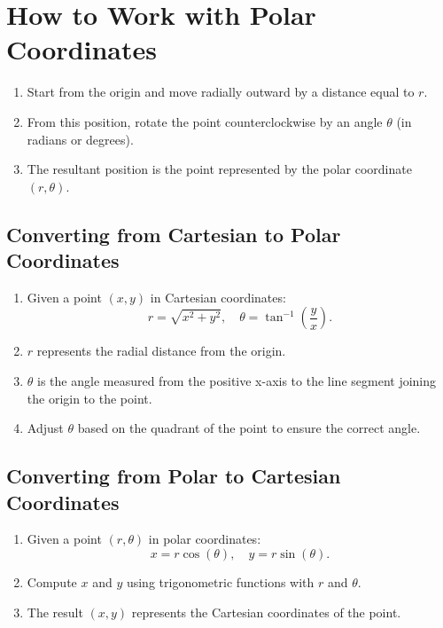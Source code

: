 \documentclass{article}
\begin{document}
\section*{How to Work with Polar Coordinates}
\begin{tipbox}
    \begin{enumerate}
        \item Start from the origin and move radially outward by a distance equal to \( r \).
        \item From this position, rotate the point counterclockwise by an angle \( \theta \) (in radians or degrees).
        \item The resultant position is the point represented by the polar coordinate \( (r, \theta) \).
    \end{enumerate}
    
    \vspace{1em}
    
    \subsection*{Converting from Cartesian to Polar Coordinates}
    \begin{algorithmbox}
    
        \begin{enumerate}
            \item Given a point \( (x, y) \) in Cartesian coordinates:
                  \[
                  r = \sqrt{x^2 + y^2}, \quad \theta = \tan^{-1}\left(\frac{y}{x}\right).
                  \]
            \item \( r \) represents the radial distance from the origin.
            \item \( \theta \) is the angle measured from the positive x-axis to the line segment joining the origin to the point.
            \item Adjust \( \theta \) based on the quadrant of the point to ensure the correct angle.
        \end{enumerate}
    \end{algorithmbox}
    
    \vspace{1em}
    
    \subsection*{Converting from Polar to Cartesian Coordinates}
    \begin{algorithmbox}
        \begin{enumerate}
            \item Given a point \( (r, \theta) \) in polar coordinates:
                  \[
                  x = r\cos(\theta), \quad y = r\sin(\theta).
                  \]
            \item Compute \( x \) and \( y \) using trigonometric functions with \( r \) and \( \theta \).
            \item The result \( (x, y) \) represents the Cartesian coordinates of the point.
        \end{enumerate}
    \end{algorithmbox}
\end{tipbox}
\end{document}
